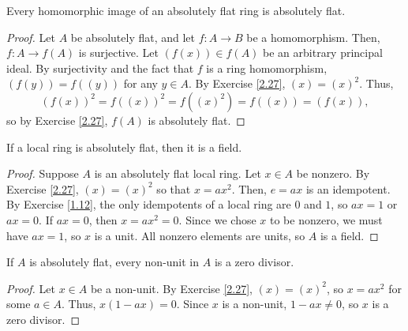 Every homomorphic image of an absolutely flat ring is absolutely flat.

\begin{proof}
Let $A$ be absolutely flat, and let $f : A \to B$ be a homomorphism. Then, $f:A \to f(A)$ is surjective. Let $(f(x)) \in f(A)$ be an arbitrary principal ideal. By surjectivity and
the fact that $f$ is a ring homomorphism, $(f(y)) = f((y))$ for any $y \in A$. By Exercise \ref{2.27}, $(x) = (x)^2$. Thus,
$$(f(x))^2 = f((x))^2 = f((x)^2) = f((x)) = (f(x)),$$
so by Exercise \ref{2.27}, $f(A)$ is absolutely flat.
\end{proof}

If a local ring is absolutely flat, then it is a field.

\begin{proof}
Suppose $A$ is an absolutely flat local ring. Let $x \in A$ be nonzero. By Exercise \ref{2.27}, $(x) = (x)^2$ so that $x = ax^2$. Then, $e = ax$ is an idempotent. 
By Exercise \ref{1.12}, the only idempotents of a local ring are $0$ and $1$, so $ax = 1$ or $ax = 0$. If $ax = 0$, then $x = ax^2 = 0$. Since we chose $x$ to be nonzero,
we must have $ax = 1$, so $x$ is a unit. All nonzero elements are units, so $A$ is a field.
\end{proof}

If $A$ is absolutely flat, every non-unit in $A$ is a zero divisor.

\begin{proof}
Let $x \in A$ be a non-unit. By Exercise \ref{2.27}, $(x) = (x)^2$, so $x = ax^2$ for some $a \in A$. Thus, $x(1-ax) = 0$. Since $x$ is a non-unit, $1 - ax \neq 0$, so $x$
is a zero divisor.
\end{proof}

